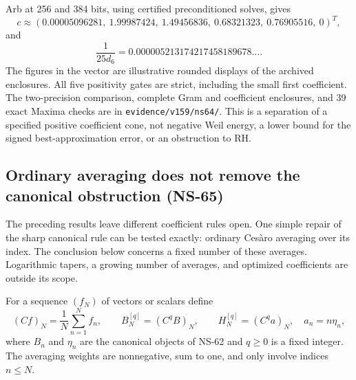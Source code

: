 \documentclass[11pt]{article}
\theoremstyle{remark}
\begin{document}
Arb at 256 and 384 bits, using certified preconditioned solves, gives
\[
 c\approx(0.00005096281,\ 1.99987424,\ 1.49456836,\
            0.68321323,\ 0.76905516,\ 0)^T,
\]
and
\[
 \frac1{25d_6}=0.000005213174217458189678\ldots.
\]
The figures in the vector are illustrative rounded displays of the
archived enclosures. All five positivity gates are strict, including
the small first coefficient. The two-precision comparison, complete
Gram and coefficient enclosures, and 39 exact Maxima checks are in
\texttt{evidence/v159/ns64/}. This is a separation of a specified
positive coefficient cone, not negative Weil energy, a lower bound for
the signed best-approximation error, or an obstruction to RH.

\subsection{Ordinary averaging does not remove the canonical obstruction (NS-65)}
\label{sec:ns65-cesaro}

The preceding results leave different coefficient rules open. One simple
repair of the sharp canonical rule can be tested exactly: ordinary
Ces\`aro averaging over its index. The conclusion below concerns a fixed
number of these averages. Logarithmic tapers, a growing number of averages,
and optimized coefficients are outside its scope.

For a sequence $(f_N)$ of vectors or scalars define
\[
 (Cf)_N=\frac1N\sum_{n=1}^Nf_n,\qquad
 B_N^{[q]}=(C^qB)_N,\qquad
 H_N^{[q]}=(C^q a)_N,\quad a_n=n\eta_n,
\]
where $B_n$ and $\eta_n$ are the canonical objects of NS-62 and
$q\geq0$ is a fixed integer. The averaging weights are nonnegative,
sum to one, and only involve indices $n\leq N$.
\end{document}
